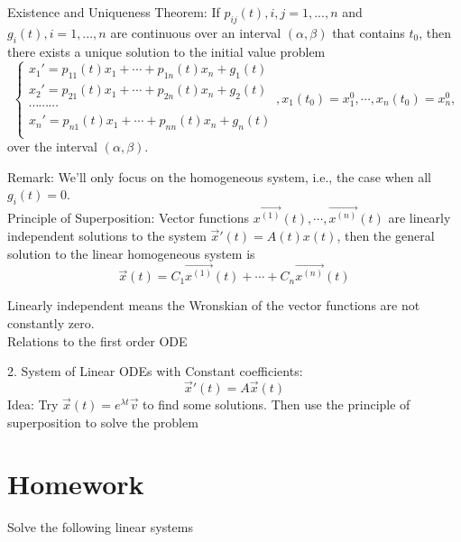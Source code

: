 \documentclass[11pt]{article}
\begin{document}
Existence and Uniqueness Theorem: If $p_{ij}(t), i,j = 1, ..., n$ and $g_i(t), i=1, ... , n$ are continuous over an interval $(\alpha,\beta)$ that contains $t_0$, then there exists a unique solution to the initial value problem 
$$\left\{\begin{array}{c}
x_1'= p_{11}(t) x_1 + \cdots + p_{1n}(t)x_n + g_1(t)\\
x_2'= p_{21}(t) x_1 + \cdots + p_{2n}(t)x_n + g_2(t)\\
\cdots \cdots \cdots \\
x_n'= p_{n1}(t) x_1 + \cdots + p_{nn}(t)x_n + g_n(t)\\
\end{array}\right., x_1(t_0)=x_1^0, \cdots, x_n(t_0)=x_n^0,$$
over the interval $(\alpha, \beta)$. 

Remark: We'll only focus on the homogeneous system, i.e., the case when all $g_i(t) = 0$. \\

Principle of Superposition: Vector functions $\overrightarrow{x^{(1)}}(t), \cdots, \overrightarrow{x^{(n)}}(t)$ are linearly independent solutions to the system $\overrightarrow{x}'(t) = A(t) x(t)$, then the general solution to the linear homogeneous system is 
$$\overrightarrow{x}(t) = C_1 \overrightarrow{x^{(1)}}(t)+ \cdots+ C_n\overrightarrow{x^{(n)}}(t)$$

Linearly independent means the Wronskian of the vector functions are not constantly zero. \\

Relations to the first order ODE



2. System of Linear ODEs with Constant coefficients:
$$\overrightarrow{x}'(t)=A \overrightarrow{x}(t) $$
Idea: Try $\overrightarrow{x}(t) = e^{\lambda t}\overrightarrow{v}$ to find some solutions. Then use the principle of superposition to solve the problem 

\newpage

\section*{Homework}

\newcommand{\ORA}{\overrightarrow}

Solve the following linear systems
\end{document}
